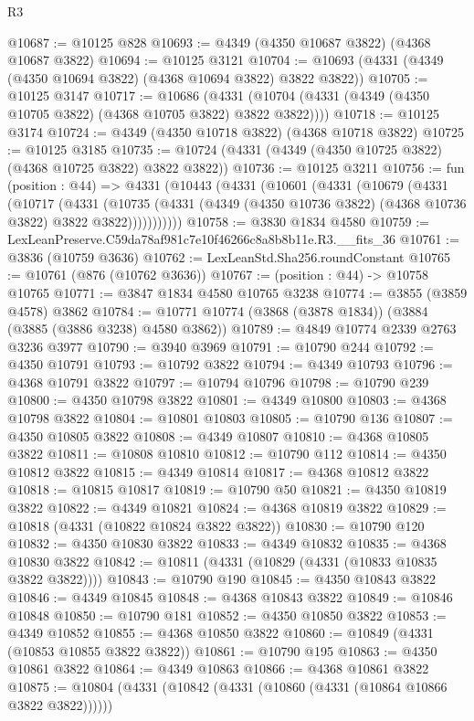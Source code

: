 \begin{lexlean}{R3}
\begin{coremodule}
@10687 := @10125 @828
@10693 := @4349 (@4350 @10687 @3822) (@4368 @10687 @3822)
@10694 := @10125 @3121
@10704 := @10693 (@4331 (@4349 (@4350 @10694 @3822) (@4368 @10694 @3822) @3822 @3822))
@10705 := @10125 @3147
@10717 := @10686
    (@4331 (@10704 (@4331 (@4349 (@4350 @10705 @3822) (@4368 @10705 @3822) @3822 @3822))))
@10718 := @10125 @3174
@10724 := @4349 (@4350 @10718 @3822) (@4368 @10718 @3822)
@10725 := @10125 @3185
@10735 := @10724 (@4331 (@4349 (@4350 @10725 @3822) (@4368 @10725 @3822) @3822 @3822))
@10736 := @10125 @3211
@10756 := fun (position : @44) =>
  @4331
    (@10443
      (@4331
        (@10601
          (@4331
            (@10679
              (@4331
                (@10717
                  (@4331
                    (@10735
                      (@4331 (@4349 (@4350 @10736 @3822) (@4368 @10736 @3822) @3822 @3822)))))))))))
@10758 := @3830 @1834 @4580
@10759 := LexLeanPreserve.C59da78af981c7e10f46266c8a8b8b11e.R3.__fits_36
@10761 := @3836 (@10759 @3636)
@10762 := LexLeanStd.Sha256.roundConstant
@10765 := @10761 (@876 (@10762 @3636))
@10767 := (position : @44) -> @10758 @10765
@10771 := @3847 @1834 @4580 @10765 @3238
@10774 := @3855 (@3859 @4578) @3862
@10784 := @10771 @10774 (@3868 (@3878 @1834)) (@3884 (@3885 (@3886 @3238) @4580 @3862))
@10789 := @4849 @10774 @2339 @2763 @3236 @3977
@10790 := @3940 @3969
@10791 := @10790 @244
@10792 := @4350 @10791
@10793 := @10792 @3822
@10794 := @4349 @10793
@10796 := @4368 @10791 @3822
@10797 := @10794 @10796
@10798 := @10790 @239
@10800 := @4350 @10798 @3822
@10801 := @4349 @10800
@10803 := @4368 @10798 @3822
@10804 := @10801 @10803
@10805 := @10790 @136
@10807 := @4350 @10805 @3822
@10808 := @4349 @10807
@10810 := @4368 @10805 @3822
@10811 := @10808 @10810
@10812 := @10790 @112
@10814 := @4350 @10812 @3822
@10815 := @4349 @10814
@10817 := @4368 @10812 @3822
@10818 := @10815 @10817
@10819 := @10790 @50
@10821 := @4350 @10819 @3822
@10822 := @4349 @10821
@10824 := @4368 @10819 @3822
@10829 := @10818 (@4331 (@10822 @10824 @3822 @3822))
@10830 := @10790 @120
@10832 := @4350 @10830 @3822
@10833 := @4349 @10832
@10835 := @4368 @10830 @3822
@10842 := @10811 (@4331 (@10829 (@4331 (@10833 @10835 @3822 @3822))))
@10843 := @10790 @190
@10845 := @4350 @10843 @3822
@10846 := @4349 @10845
@10848 := @4368 @10843 @3822
@10849 := @10846 @10848
@10850 := @10790 @181
@10852 := @4350 @10850 @3822
@10853 := @4349 @10852
@10855 := @4368 @10850 @3822
@10860 := @10849 (@4331 (@10853 @10855 @3822 @3822))
@10861 := @10790 @195
@10863 := @4350 @10861 @3822
@10864 := @4349 @10863
@10866 := @4368 @10861 @3822
@10875 := @10804 (@4331 (@10842 (@4331 (@10860 (@4331 (@10864 @10866 @3822 @3822))))))

\end{coremodule}
\end{lexlean}
